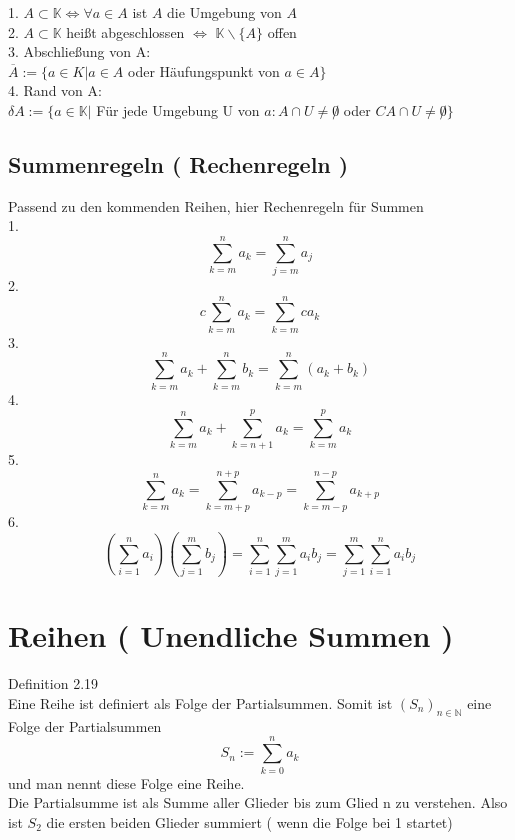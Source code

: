 \documentclass[headsepline,12pt,a4paper]{scrartcl}
\begin{document}
1. $ A \subset \mathbb{K} \Leftrightarrow \forall a \in A $ ist $A$ die Umgebung von $A$ \\
2.  $ A \subset \mathbb{K}$ heißt abgeschlossen $\Leftrightarrow$ $\mathbb{K} \backslash \{A\}$ offen \\
3. Abschließung von A: \\
$ \overline{A}:= \{a \in K | a \in A $ oder Häufungspunkt von $a \in A \}$ \\

4. Rand von A: \\
$\delta A:= \{a \in \mathbb{K}| $ Für jede Umgebung U von $a:A\cap U \neq \not 0$ oder $CA \cap U \neq \not 0 \}$\\

\newpage

\subsection*{Summenregeln ( Rechenregeln )}

Passend zu den kommenden Reihen, hier Rechenregeln für Summen \\

1. $$ \sum\limits_{k=m}^n a_k = \sum\limits_{j=m}^n a_j $$ 
2. $$ c  \sum\limits_{k=m}^n a_k = \sum\limits_{k=m}^n c a_k $$
3. $$ \sum\limits_{k=m}^n a_k + \sum\limits_{k=m}^n b_k = \sum\limits_{k=m}^n (a_k + b_k) $$
4. $$ \sum\limits_{k=m}^n a_k +\sum\limits_{k=n+1}^p a_k = \sum\limits_{k=m}^p a_k $$
5. $$ \sum\limits_{k=m}^n a_k = \sum\limits_{k=m+p}^{n+p} a_{k-p} = \sum\limits_{k=m-p}^{n-p} a_{k+p} $$
6. $$ ( \sum\limits_{i=1}^n a_i ) ( \sum\limits_{j=1}^m b_j ) = \sum\limits_{i=1}^n  \sum\limits_{j=1}^m a_i b_j 
= \sum\limits_{j=1}^m \sum\limits_{i=1}^n  a_i b_j $$ 

\newpage

\section*{Reihen ( Unendliche Summen ) }

Definition 2.19 \\
Eine Reihe ist definiert als Folge der Partialsummen. Somit ist $(S_n)_{n\in \mathbb{N}}$ eine Folge der Partialsummen \\
$$ S_n:= \sum\limits_{k=0}^n a_k $$
und man nennt diese Folge eine Reihe. \\
Die Partialsumme ist als Summe aller Glieder bis zum Glied n zu verstehen. Also ist $S_2$ die ersten beiden Glieder summiert 
( wenn die Folge bei 1 startet) \\
\end{document}
